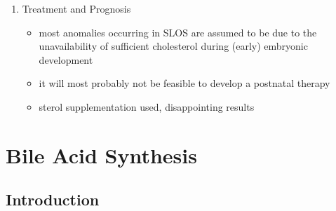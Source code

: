 \documentclass{scrartcl}
\begin{document}
\begin{enumerate}
\item Treatment and Prognosis
\label{sec:orgcd5de15}
\begin{itemize}
\item most anomalies occurring in SLOS are assumed to be due to the
unavailability of sufficient cholesterol during (early) embryonic
development
\item it will most probably not be feasible to develop a postnatal therapy
\item sterol supplementation used, disappointing results
\end{itemize}
\end{enumerate}
\section{Bile Acid Synthesis}
\label{sec:orgb4b51a8}
\subsection{Introduction}
\label{sec:orgcf9ef5f}
\end{document}
